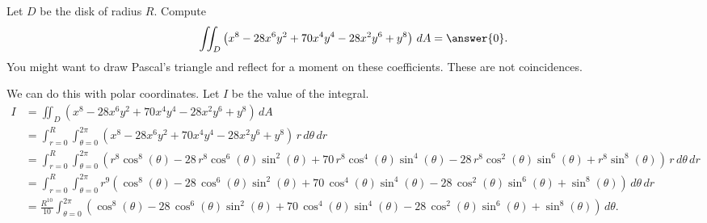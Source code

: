 \documentclass{ximera}
\author{Jim Fowler}
\begin{document}
\begin{exercise}
  Let $D$ be the disk of radius $R$.  Compute
  $$
  \iint_D \left( x^8-28 x^6 y^2+70 x^4 y^4-28 x^2 y^6+y^8 \right) \, dA = \answer{0}.
  $$
You might want to draw Pascal's triangle and reflect for a moment on
these coefficients.  These are not coincidences.

\begin{hint}
  We can do this with polar coordinates.  Let $I$ be the value of the integral.
  \begin{align*}
    I &= \iint_D \left( x^8-28 x^6 y^2+70 x^4 y^4-28 x^2 y^6+y^8 \right) \, dA \\
      &= 
\int_{r =0}^R \int_{\theta = 0}^{2\pi} \left( x^8-28 x^6 y^2+70 x^4 y^4-28 x^2 y^6+y^8 \right) \, r \, d\theta \, dr \\
      &= 
        \int_{r =0}^R \int_{\theta = 0}^{2\pi} \left( r^{8} \cos^8\left(\theta\right) - 28 \, r^{8} \cos^6 \left(\theta\right) \sin^2 \left(\theta\right) + 70 \, r^{8} \cos^4 \left(\theta\right) \sin^4 \left(\theta\right) - 28 \, r^{8} \cos^2 \left(\theta\right) \sin^6 \left(\theta\right) + r^{8} \sin^8 \left(\theta\right) \right) \, r \, d\theta \, dr \\
      &= 
        \int_{r =0}^R \int_{\theta = 0}^{2\pi} r^9 \left( \cos^8\left(\theta\right) - 28 \, \cos^6 \left(\theta\right) \sin^2 \left(\theta\right) + 70 \, \cos^4 \left(\theta\right) \sin^4 \left(\theta\right) - 28 \, \cos^2 \left(\theta\right) \sin^6 \left(\theta\right) + \sin^8 \left(\theta\right) \right) \, d\theta \, dr \\
      &= 
        \frac{R^{10}}{10} \int_{\theta = 0}^{2\pi} \left( \cos^8\left(\theta\right) - 28 \, \cos^6 \left(\theta\right) \sin^2 \left(\theta\right) + 70 \, \cos^4 \left(\theta\right) \sin^4 \left(\theta\right) - 28 \, \cos^2 \left(\theta\right) \sin^6 \left(\theta\right) + \sin^8 \left(\theta\right) \right) \, d\theta.
  \end{align*}
\end{hint}


\end{exercise}
\end{document}
